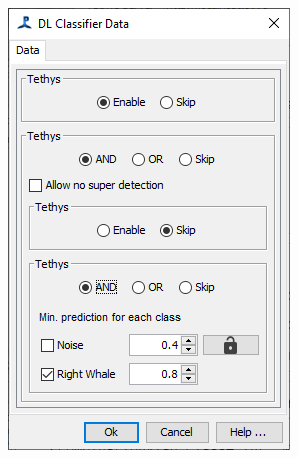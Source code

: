 \documentclass[
]{article}
\begin{document}
\begin{figure}
\begin{minipage}{0.33\linewidth}
{\includegraphics[width=0.99\linewidth,height=\textheight,keepaspectratio]{./media/dataselection.png}

}


\end{minipage}%
\newline
\begin{minipage}{0.33\linewidth}

\centering{

}
\end{minipage}
\end{figure}
\end{document}
